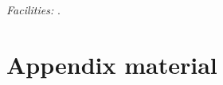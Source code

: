 \documentclass[12pt,preprint]{emulateapj}
\begin{document}

{\it Facilities:}  .


\appendix

\section{Appendix material}



\end{document}
